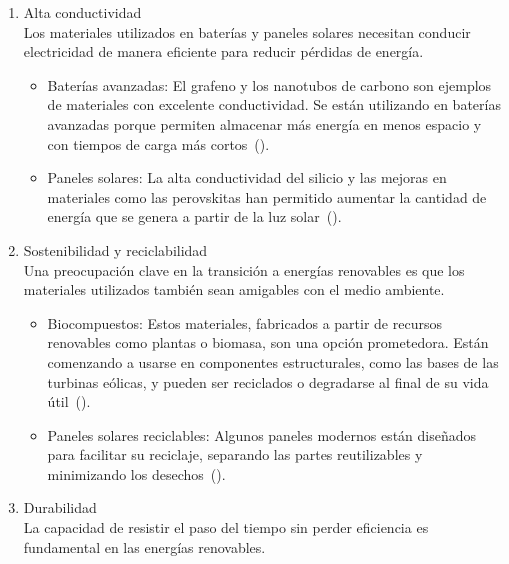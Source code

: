 \documentclass[letterpaper, 12pt]{article}
\begin{document}
\begin{enumerate}
      \item Alta conductividad \\ Los materiales utilizados en baterías y paneles solares
            necesitan conducir electricidad de manera eficiente para reducir pérdidas de
            energía.

            \begin{itemize}
                  \item Baterías avanzadas: El grafeno y los nanotubos de carbono son ejemplos de
                        materiales con excelente conductividad. Se están utilizando en baterías
                        avanzadas porque permiten almacenar más energía en menos espacio y con tiempos
                        de carga más cortos~(\cite{Uyor2021}).
                  \item Paneles solares: La alta conductividad del silicio y las mejoras en materiales
                        como las perovskitas han permitido aumentar la cantidad de energía que se
                        genera a partir de la luz solar~(\cite{Henriksson2021}).
            \end{itemize}

      \item Sostenibilidad y reciclabilidad \\ Una preocupación clave en la transición a
            energías renovables es que los materiales utilizados también sean amigables con
            el medio ambiente.
            \begin{itemize}
                  \item Biocompuestos: Estos materiales, fabricados a partir de recursos renovables
                        como plantas o biomasa, son una opción prometedora. Están comenzando a usarse
                        en componentes estructurales, como las bases de las turbinas eólicas, y pueden
                        ser reciclados o degradarse al final de su vida útil~(\cite{Galembeck2019}).
                  \item Paneles solares reciclables: Algunos paneles modernos están diseñados para
                        facilitar su reciclaje, separando las partes reutilizables y minimizando los
                        desechos~(\cite{Leader_Gaustad2019a}).
            \end{itemize}

      \item Durabilidad \\ La capacidad de resistir el paso del tiempo sin perder
            eficiencia es fundamental en las energías renovables.


\end{enumerate}
\end{document}
